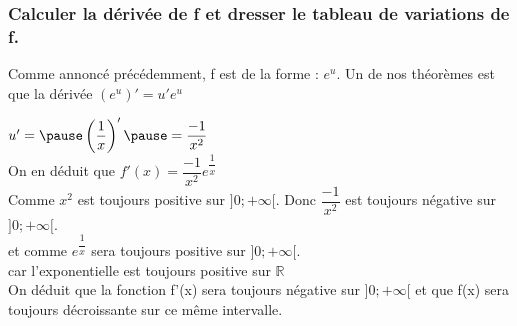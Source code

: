 \documentclass[t]{beamer}
\begin{document}
\begin{frame}
\frametitle{Calculer la dérivée de f et dresser le tableau de variations de f.}
\pause
Comme annoncé précédemment, f est de la forme : $ e^u $.
\pause
Un de nos théorèmes est que la dérivée 
\( (e^u)' = u'e^u \)
\\
\pause

\( u' = \pause \left( \dfrac{1}{x} \right)' \pause = \dfrac{-1}{x^2} \)
\pause
\\
On en déduit que 
\( f'(x) = \dfrac{-1}{x^2} e^{\dfrac{1}{x}}\)
\\

\pause
Comme $x^2$ est toujours positive sur $ ] 0 ; + \infty [ $.
\pause
Donc 
\( \dfrac{-1}{x^2} \)
est toujours négative sur $ ] 0 ; + \infty [ $.
\\
\pause
et comme 
\( e^{\dfrac{1}{x}} \)
sera toujours positive sur $ ] 0 ; + \infty [ $.
\\
\pause
car l'exponentielle est toujours positive sur $ \mathbb{R} $ 
\\
\pause
On déduit que la fonction f'(x) sera toujours négative sur $ ] 0 ; + \infty [ $ et que f(x) sera toujours décroissante sur ce même intervalle. 
 


\end{frame}
\end{document}
